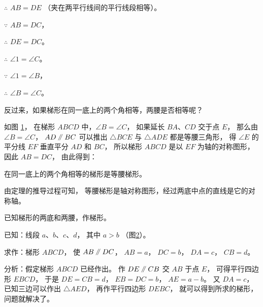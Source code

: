 $\therefore$ \quad $AB = DE$ （夹在两平行线间的平行线段相等）。

$\because$ \quad $AB = DC$，

$\therefore$ \quad $DE = DC$。

$\therefore$ \quad $\angle 1 = \angle C$。

$\because$ \quad $\angle 1 = \angle B$，

$\therefore$ \quad $\angle B = \angle C$。

反过来，如果梯形在同一底上的两个角相等，两腰是否相等呢？

\begin{figure}[htbp]
    \centering
    \begin{minipage}[b]{4.5cm}
        \centering
        
        \caption{}\label{fig:czjh1-4-39}
    \end{minipage}
    \qquad
    \begin{minipage}[b]{4.5cm}
        \centering
        
        \caption{}\label{fig:czjh1-4-40}
    \end{minipage}
\end{figure}

如图 \ref{fig:czjh1-4-40}， 在梯形 $ABCD$ 中，$\angle B = \angle C$， 如果延长 $BA$、$CD$ 交于点 $E$，
那么由 $\angle B = \angle C$， $AD \pingxing BC$ 可以推出 $\triangle BCE$ 与
$\triangle ADE$ 都是等腰三角形， 得 $\angle E$ 的平分线 $EF$ 垂直平分 $AD$ 和 $BC$，
所以梯形 $ABCD$ 是以 $EF$ 为轴的对称图形， 因此 $AB = DC$， 由此得到：

\begin{dingli}[等腰梯形判定定理]
    在同一底上的两个角相等的梯形是等腰梯形。
\end{dingli}

由定理的推导过程可知， 等腰梯形是轴对称图形，经过两底中点的直线是它的对称轴。


\liti[0] 已知梯形的两底和两腰，作梯形。

已知：线段 $a$、$b$、$c$、$d$， 其中 $a > b$ （图\ref{fig:czjh1-4-41}）。

求作：梯形 $ABCD$， 使 $AB \pingxing DC$， $AB = a$， $DC = b$， $DA = c$， $CB = d$。

\begin{figure}[htbp]
    \centering
    
    \caption{}\label{fig:czjh1-4-41}
\end{figure}

分析：假定梯形 $ABCD$ 已经作出。 作 $DE \pingxing CB$ 交 $AB$ 于点 $E$，
可得平行四边形 $EBCD$， 于是 $DE = CB = d$， $EB = DC = b$， $AE = a - b$。
又 $DA = c$， 已知三边可以作出 $\triangle AED$， 再作平行四边形 $DEBC$，
就可以得到所求的梯形， 问题就解决了。

